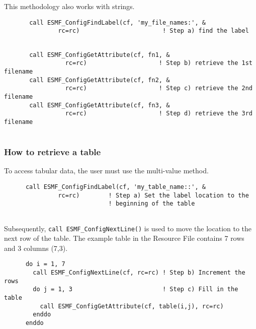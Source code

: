 
   This methodology also works with strings. 

 \begin{verbatim}
       call ESMF_ConfigFindLabel(cf, 'my_file_names:', &
               rc=rc)                       ! Step a) find the label
 
\end{verbatim}
 

 \begin{verbatim}
       call ESMF_ConfigGetAttribute(cf, fn1, &
                 rc=rc)                    ! Step b) retrieve the 1st filename
       call ESMF_ConfigGetAttribute(cf, fn2, &
                 rc=rc)                    ! Step c) retrieve the 2nd filename
       call ESMF_ConfigGetAttribute(cf, fn3, &
                 rc=rc)                    ! Step d) retrieve the 3rd filename
 
\end{verbatim}
 

  \subsubsection{How to retrieve a table}
 
   To access tabular data, the user must use the multi-value method.  

 \begin{verbatim}
      call ESMF_ConfigFindLabel(cf, 'my_table_name::', &
               rc=rc)        ! Step a) Set the label location to the 
                             ! beginning of the table
 
\end{verbatim}
 

   Subsequently, {\tt call ESMF\_ConfigNextLine()} is used to move the location 
   to the next row of the table. The example table in the Resource File contains
   7 rows and 3 columns (7,3). 

 \begin{verbatim}
      do i = 1, 7
        call ESMF_ConfigNextLine(cf, rc=rc) ! Step b) Increment the rows
        do j = 1, 3                         ! Step c) Fill in the table 
          call ESMF_ConfigGetAttribute(cf, table(i,j), rc=rc)
        enddo
      enddo
 
\end{verbatim}
 

